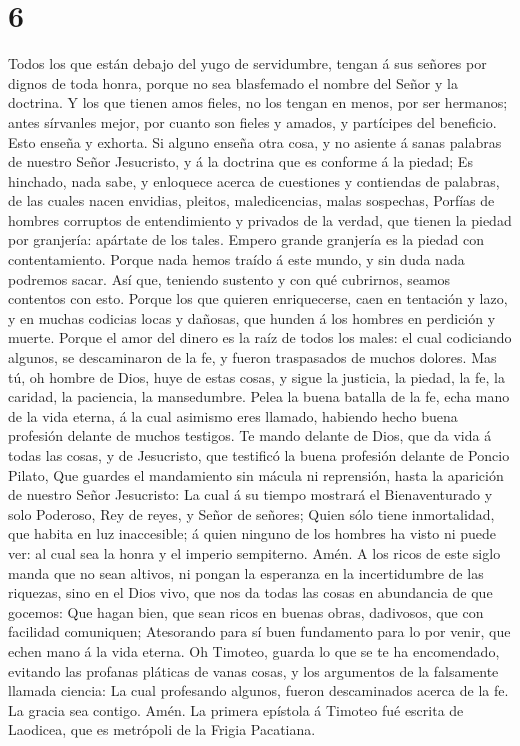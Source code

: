 \hypertarget{section-5}{%
\section{6}\label{section-5}}

 Todos los que están debajo del yugo de servidumbre, tengan
á sus señores por dignos de toda honra, porque no sea blasfemado el
nombre del Señor y la doctrina.  Y los que tienen amos
fieles, no los tengan en menos, por ser hermanos; antes sírvanles mejor,
por cuanto son fieles y amados, y partícipes del beneficio. Esto enseña
y exhorta.  Si alguno enseña otra cosa, y no asiente á sanas
palabras de nuestro Señor Jesucristo, y á la doctrina que es conforme á
la piedad;  Es hinchado, nada sabe, y enloquece acerca de
cuestiones y contiendas de palabras, de las cuales nacen envidias,
pleitos, maledicencias, malas sospechas,  Porfías de hombres
corruptos de entendimiento y privados de la verdad, que tienen la piedad
por granjería: apártate de los tales.  Empero grande
granjería es la piedad con contentamiento.  Porque nada
hemos traído á este mundo, y sin duda nada podremos sacar. 
Así que, teniendo sustento y con qué cubrirnos, seamos contentos con
esto.  Porque los que quieren enriquecerse, caen en
tentación y lazo, y en muchas codicias locas y dañosas, que hunden á los
hombres en perdición y muerte.  Porque el amor del dinero
es la raíz de todos los males: el cual codiciando algunos, se
descaminaron de la fe, y fueron traspasados de muchos dolores.
 Mas tú, oh hombre de Dios, huye de estas cosas, y sigue la
justicia, la piedad, la fe, la caridad, la paciencia, la mansedumbre.
 Pelea la buena batalla de la fe, echa mano de la vida
eterna, á la cual asimismo eres llamado, habiendo hecho buena profesión
delante de muchos testigos.  Te mando delante de Dios, que
da vida á todas las cosas, y de Jesucristo, que testificó la buena
profesión delante de Poncio Pilato,  Que guardes el
mandamiento sin mácula ni reprensión, hasta la aparición de nuestro
Señor Jesucristo:  La cual á su tiempo mostrará el
Bienaventurado y solo Poderoso, Rey de reyes, y Señor de señores;
 Quien sólo tiene inmortalidad, que habita en luz
inaccesible; á quien ninguno de los hombres ha visto ni puede ver: al
cual sea la honra y el imperio sempiterno. Amén.  A los
ricos de este siglo manda que no sean altivos, ni pongan la esperanza en
la incertidumbre de las riquezas, sino en el Dios vivo, que nos da todas
las cosas en abundancia de que gocemos:  Que hagan bien,
que sean ricos en buenas obras, dadivosos, que con facilidad comuniquen;
 Atesorando para sí buen fundamento para lo por venir, que
echen mano á la vida eterna.  Oh Timoteo, guarda lo que se
te ha encomendado, evitando las profanas pláticas de vanas cosas, y los
argumentos de la falsamente llamada ciencia:  La cual
profesando algunos, fueron descaminados acerca de la fe. La gracia sea
contigo. Amén. La primera epístola á Timoteo fué escrita de Laodicea,
que es metrópoli de la Frigia Pacatiana.
